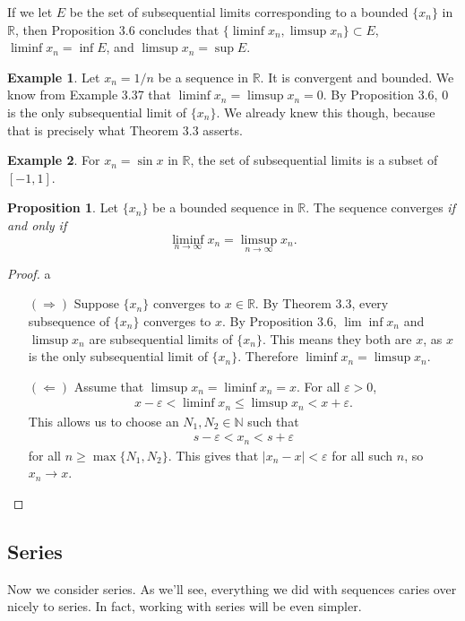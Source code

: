 \documentclass{article}
\newcommand{\N}{\mathbb{N}}
\newcommand{\R}{\mathbb{R}}
\theoremstyle{definition}
\newtheorem{proposition}{Proposition}[section]
\newtheorem{example}{Example}[section]
\begin{document}
If we let $ E $ be the set of subsequential limits corresponding to a bounded $ \{x_n\} $ in $ \R $, then Proposition 3.6 concludes that $ \{\liminf x_n,\limsup x_n\}\subset E $, $ \liminf x_n=\inf E $, and $ \limsup x_n=\sup E $. 
\begin{example}
	Let $ x_n=1/n $ be a sequence in $ \R $. It is convergent and bounded. We know from Example 3.37 that $ \liminf x_n=\limsup x_n=0 $. By Proposition 3.6, $ 0 $ is the only subsequential limit of $ \{x_n\} $. We already knew this though, because that is precisely what Theorem 3.3 asserts.
\end{example}
\begin{example}
	For $ x_n=\sin x $ in $ \R $, the set of subsequential limits is a subset of $ [-1,1] $. 
\end{example}
\begin{proposition}
	Let $ \{x_n\} $ be a bounded sequence in $ \R $. The sequence converges \textit{if and only if} $$ \liminf\limits_{n\to\infty} x_n=\limsup\limits_{n\to\infty} x_n.$$
\end{proposition}
\begin{proof}{\color{white}a}
	\begin{enumerate}
	\item [$ (\Longrightarrow) $] Suppose $ \{x_n\} $ converges to $ x\in \R $. By Theorem 3.3, every subsequence of $ \{x_n\} $ converges to $ x $. By Proposition 3.6, $ \lim\inf x_n $ and $ \limsup x_n $ are subsequential limits of $ \{x_n\} $. This means they both are $ x $, as $ x $ is the only subsequential limit of $ \{x_n\} $. Therefore $ \liminf x_n=\limsup x_n $.  
	\item [$ (\Longleftarrow) $] Assume that $ \limsup x_n=\liminf x_n=x $. For all $ \varepsilon>0 $, 
	\begin{align*}
		x-\varepsilon < \liminf x_n \le \limsup x_n< x+\varepsilon.
	\end{align*}
	This allows us to choose an $ N_1,N_2\in\N $ such that
	 \begin{align*}
		s-\varepsilon<x_n<s+\varepsilon
	\end{align*}
	for all $ n\ge\max\{N_1,N_2\} $. This gives that $ |x_n-x|<\varepsilon $ for all such $ n $, so $ x_n\to x $. 
\end{enumerate}
\end{proof}
\subsection{Series}
Now we consider series. As we'll see, everything we did with sequences caries over nicely to series. In fact, working with series will be even simpler.
\end{document}
